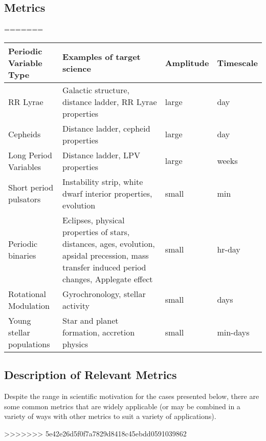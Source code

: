 \subsection{Metrics}
\label{sec:keyword:metrics}
=======
\begin{center}
\begin{tabular}{| l | p{8cm} |l | l |}
\hline Periodic Variable Type & Examples of target science & Amplitude & Timescale\\
\hline
RR Lyrae & Galactic structure, distance ladder, RR Lyrae properties&  large &  day \\
Cepheids & Distance ladder, cepheid properties&  large &  day \\
Long Period Variables & Distance ladder, LPV properties & large  &  weeks \\
Short period pulsators & Instability strip, white dwarf interior properties, evolution&  small & min  \\
Periodic binaries & Eclipses, physical properties of stars, distances, ages, evolution, apsidal precession, mass transfer induced period changes, Applegate effect &  small &  hr-day \\
Rotational Modulation & Gyrochronology, stellar activity& small  &  days \\
Young stellar populations & Star and planet formation, accretion physics & small  &  min-days \\
 \hline \end{tabular}
 \end{center}

\subsection{Description of Relevant Metrics}
\label{sec:keyword:variablemetrics}

Despite the range in scientific motivation for the cases presented below, there are some common metrics that are widely applicable (or may be combined in a variety of ways with other metrics to suit a variety of applications). 

>>>>>>> 5e42e26d5f0f7a7829d8418c45ebdd0591039862

